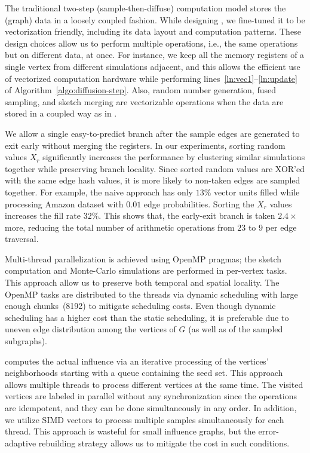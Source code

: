 \documentclass[final,5p,times,twocolumn]{elsarticle}
\newcommand\acro{{\sc{HyperFuseR\xspace}\xspace}\xspace}
\begin{document}
The traditional two-step (sample-then-diffuse) computation model stores the (graph) data in a loosely coupled fashion.
While designing \acro, we fine-tuned it to be vectorization friendly, including its data layout and computation patterns. These design choices allow us to perform multiple operations, i.e., the same operations but on different data, at once. For instance, we keep all the memory registers of a single vertex from different simulations adjacent, and this allows the efficient use of vectorized computation hardware while performing lines~\ref{ln:vec1}--\ref{ln:update} of Algorithm~\ref{algo:diffusion-step}. Also, random number generation, fused sampling, and sketch merging are vectorizable operations when the data are stored in a coupled way as in \acro.

We allow a single easy-to-predict branch after the sample edges are generated to exit early without merging the registers. In our experiments, sorting random values $X_r$ significantly increases the performance by clustering similar simulations together while preserving branch locality. Since sorted random values are XOR'ed with the same edge hash values, it is more likely to non-taken edges are sampled together. For example, the naive approach has only $13\%$ vector units filled while processing Amazon dataset with $0.01$ edge probabilities. Sorting the $X_r$ values increases the fill rate  $32\%$. This shows that, the early-exit branch is taken $2.4\times$ more, reducing the total number of arithmetic operations from $23$ to $9$ per edge traversal.

Multi-thread parallelization is achieved using OpenMP pragmas; the sketch computation and Monte-Carlo simulations are performed in per-vertex tasks. This approach allow us to preserve both temporal and spatial locality. The OpenMP tasks are distributed to the threads via dynamic scheduling with large enough chunks~(8192) to mitigate scheduling costs. Even though dynamic scheduling has a higher cost than the static scheduling, it is preferable due to uneven edge distribution among the vertices of $G$ (as well as of the sampled subgraphs).  

\acro computes the actual influence via an iterative processing of the vertices' neighborhoods starting with a queue containing the seed set. This approach allows multiple threads to process different vertices at the same time. The visited vertices are labeled in parallel without any synchronization since the operations are idempotent, and they can be done simultaneously in any order. In addition, we utilize SIMD vectors to process multiple samples simultaneously for each thread. This approach is wasteful for small influence graphs, but the error-adaptive rebuilding strategy allows us to mitigate the cost in such conditions.   
\end{document}
